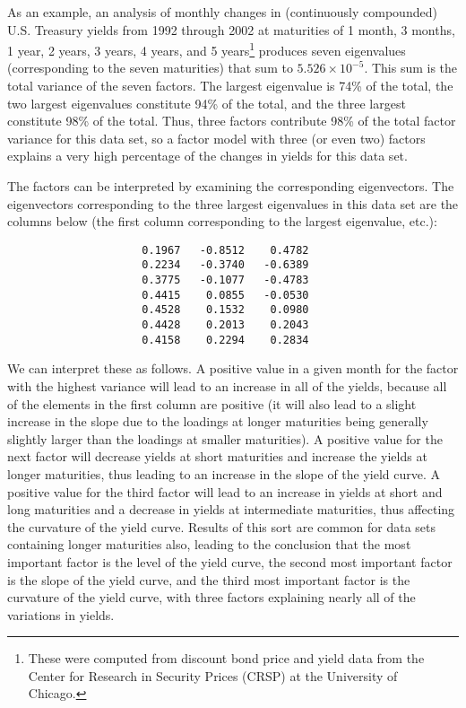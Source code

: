 As an example, an analysis of monthly changes in (continuously compounded) U.S. Treasury yields from 1992 through 2002 at maturities of 1 month, 3 months, 1 year, 2 years, 3 years, 4 years, and 5 years\footnote{These were computed from discount bond price and yield data from the Center for Research in Security Prices (CRSP) at the University of Chicago.}  produces seven eigenvalues (corresponding to the seven maturities) that sum to $5.526 \times 10^{-5}$.  This sum is the total variance of the seven factors.  The largest eigenvalue is 74\% of the total, the  two largest eigenvalues constitute 94\% of the total, and the three largest constitute 98\% of the total.  Thus, three factors contribute 98\% of the total factor variance for this data set, so a factor model with three (or even two) factors explains a very high percentage of the changes in yields for this data set.  

The factors can be interpreted by examining the corresponding eigenvectors.  The eigenvectors corresponding to the three largest eigenvalues in this data set are the columns below (the first column corresponding to the largest eigenvalue, etc.):
\small\begin{verbatim}
                     0.1967   -0.8512    0.4782
                     0.2234   -0.3740   -0.6389
                     0.3775   -0.1077   -0.4783
                     0.4415    0.0855   -0.0530
                     0.4528    0.1532    0.0980
                     0.4428    0.2013    0.2043
                     0.4158    0.2294    0.2834
\end{verbatim}\normalsize
We can interpret these as follows.  A positive value in a given month for the factor with the highest variance will lead to an increase in all of the yields, because all of the elements in the first column are positive (it will also lead to a slight increase in the slope due to the loadings at longer maturities being generally slightly larger than the loadings at smaller maturities).  A positive value for the next factor will decrease yields at short maturities and increase the yields at longer maturities, thus leading to an increase in the slope of the yield curve.  A positive value for the third factor will lead to an increase in yields at short and long maturities and a decrease in yields at intermediate maturities, thus affecting the curvature of the yield curve.  Results of this sort are common for data sets containing longer maturities also, leading to the conclusion that the most important factor is the level of the yield curve, the second most important factor is the slope of the yield curve, and the third most important factor is the curvature of the yield curve, with three factors explaining nearly all of the variations in yields.




